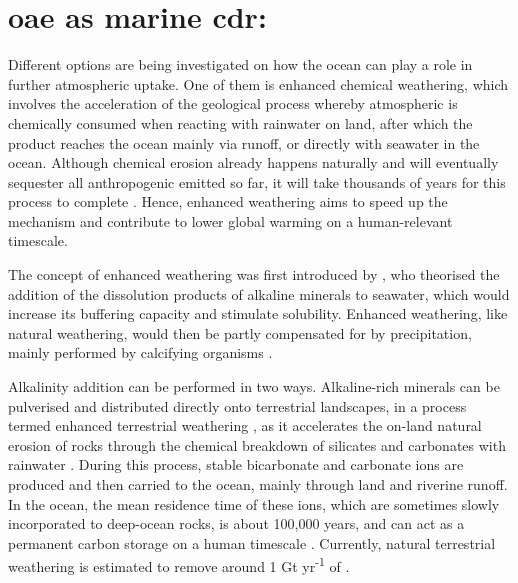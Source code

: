 \section[\texorpdfstring{OAE}{OAE} as marine \texorpdfstring{CDR}{CDR}:]{\ac{oae} as marine \ac{cdr}:}

Different options are being investigated on how the ocean can play a role in further atmospheric  uptake. One of them is enhanced chemical weathering, which involves the acceleration of the geological process whereby atmospheric  is chemically consumed when reacting with rainwater on land, after which the product reaches the ocean mainly via runoff, or directly with seawater in the ocean. Although chemical erosion already happens naturally and will eventually sequester all anthropogenic  emitted so far, it will take thousands of years for this process to complete \citep{archer2009atmospheric}. Hence, enhanced weathering aims to speed up the mechanism and contribute to lower global warming on a human-relevant timescale. 

The concept of enhanced weathering was first introduced by \cite{kheshgi1995sequestering}, who theorised the addition of the dissolution products of alkaline minerals to seawater, which would increase its buffering capacity and stimulate  solubility. Enhanced weathering, like natural weathering, would then be partly compensated for by  precipitation, mainly performed by calcifying organisms \citep{NAP26278}. 

Alkalinity addition can be performed in two ways. Alkaline-rich minerals can be pulverised and distributed directly onto terrestrial landscapes, in a process termed enhanced terrestrial weathering \citep{bach2019co2}, as it accelerates the on-land natural erosion of rocks through the chemical breakdown of silicates and carbonates with rainwater \citep{taylor2016enhanced}. During this process, stable bicarbonate and carbonate ions are produced and then carried to the ocean, mainly through land and riverine runoff. In the ocean, the mean residence time of these ions, which are sometimes slowly incorporated to deep-ocean rocks, is about 100,000 years, and can act as a permanent carbon storage on a human timescale \citep{renforth2017assessing}. Currently, natural terrestrial weathering is estimated to remove around 1 Gt yr\textsuperscript{-1} of  \citep{zhang2022river}. 

